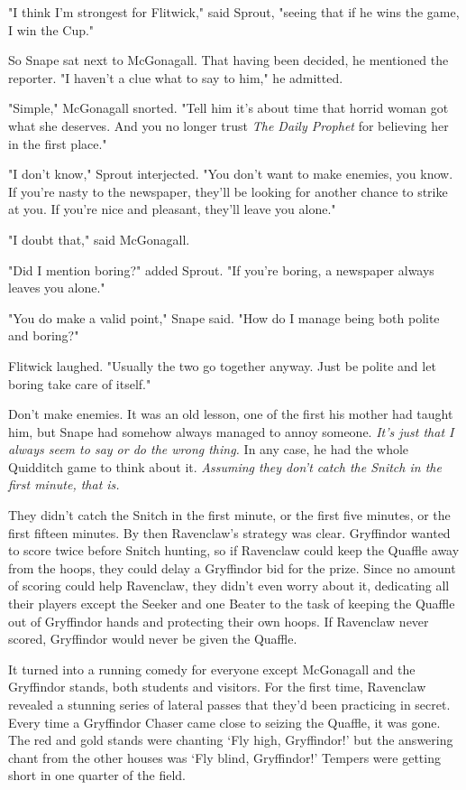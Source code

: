 "I think I'm strongest for Flitwick," said Sprout, "seeing that if he wins the game, I win the Cup."

So Snape sat next to McGonagall. That having been decided, he mentioned the reporter. "I haven't a clue what to say to him," he admitted.

"Simple," McGonagall snorted. "Tell him it's about time that horrid woman got what she deserves. And you no longer trust \emph{The Daily Prophet} for believing her in the first place."

"I don't know," Sprout interjected. "You don't want to make enemies, you know. If you're nasty to the newspaper, they'll be looking for another chance to strike at you. If you're nice and pleasant, they'll leave you alone."

"I doubt that," said McGonagall.

"Did I mention boring?" added Sprout. "If you're boring, a newspaper always leaves you alone."

"You do make a valid point," Snape said. "How do I manage being both polite and boring?"

Flitwick laughed. "Usually the two go together anyway. Just be polite and let boring take care of itself."

Don't make enemies. It was an old lesson, one of the first his mother had taught him, but Snape had somehow always managed to annoy someone. \emph{It's just that I always seem to say or do the wrong thing.} In any case, he had the whole Quidditch game to think about it. \emph{Assuming they don't catch the Snitch in the first minute, that is.}

They didn't catch the Snitch in the first minute, or the first five minutes, or the first fifteen minutes. By then Ravenclaw's strategy was clear. Gryffindor wanted to score twice before Snitch hunting, so if Ravenclaw could keep the Quaffle away from the hoops, they could delay a Gryffindor bid for the prize. Since no amount of scoring could help Ravenclaw, they didn't even worry about it, dedicating all their players except the Seeker and one Beater to the task of keeping the Quaffle out of Gryffindor hands and protecting their own hoops. If Ravenclaw never scored, Gryffindor would never be given the Quaffle.

It turned into a running comedy for everyone except McGonagall and the Gryffindor stands, both students and visitors. For the first time, Ravenclaw revealed a stunning series of lateral passes that they'd been practicing in secret. Every time a Gryffindor Chaser came close to seizing the Quaffle, it was gone. The red and gold stands were chanting `Fly high, Gryffindor!' but the answering chant from the other houses was `Fly blind, Gryffindor!' Tempers were getting short in one quarter of the field.

